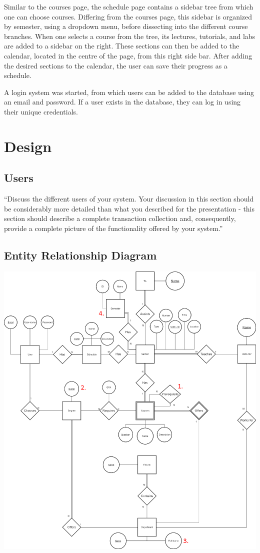 \documentclass[twoside=false,a4paper,11pt]{article}
\theoremstyle{mytheor}
\begin{document}
Similar to the courses page, the schedule page contains a sidebar tree from which one can choose courses. Differing from the courses page, this sidebar is organized by semester, using a dropdown menu, before dissecting into the different course branches. When one selects a course from the tree, its lectures, tutorials, and labs are added to a sidebar on the right. These sections can then be added to the calendar, located in the centre of the page, from this right side bar. After adding the desired sections to the calendar, the user can save their progress as a schedule.

A login system was started, from which users can be added to the database using an email and password. If a user exists in the database, they can log in using their unique credentials.

\section*{Design}

\subsection*{Users}

``Discuss the different users of your system. Your discussion in this section should be considerably more detailed than what you described for the presentation - this section should describe a complete transaction collection and, consequently, provide a complete picture of the functionality offered by your system.''


\subsection*{Entity Relationship Diagram}

\includegraphics[width=\textwidth]{ERDiagram.png}
\end{document}
